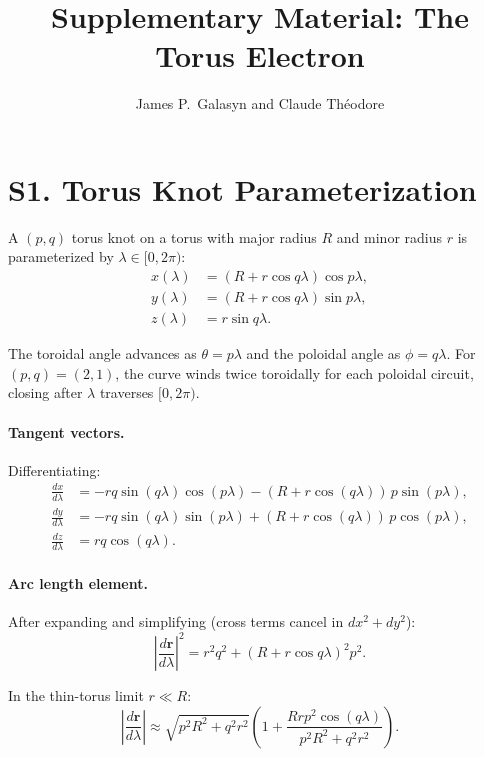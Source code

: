 \documentclass[11pt,a4paper]{article}
\title{\textbf{Supplementary Material: The Torus Electron}}
\author{James P.\ Galasyn and Claude Th\'eodore}
\date{}
\begin{document}
\maketitle

\section{S1. Torus Knot Parameterization}
\label{sec:S1}

A $(p,q)$ torus knot on a torus with major radius $R$ and minor radius $r$ is parameterized by $\lambda \in [0, 2\pi)$:
\begin{align}
  x(\lambda) &= (R + r\cos q\lambda)\cos p\lambda, \\
  y(\lambda) &= (R + r\cos q\lambda)\sin p\lambda, \\
  z(\lambda) &= r\sin q\lambda.
\end{align}

The toroidal angle advances as $\theta = p\lambda$ and the poloidal angle as $\phi = q\lambda$. For $(p,q) = (2,1)$, the curve winds twice toroidally for each poloidal circuit, closing after $\lambda$ traverses $[0, 2\pi)$.

\paragraph{Tangent vectors.} Differentiating:
\begin{align}
  \frac{dx}{d\lambda} &= -rq\sin(q\lambda)\cos(p\lambda) - (R + r\cos(q\lambda))\,p\sin(p\lambda), \\
  \frac{dy}{d\lambda} &= -rq\sin(q\lambda)\sin(p\lambda) + (R + r\cos(q\lambda))\,p\cos(p\lambda), \\
  \frac{dz}{d\lambda} &= rq\cos(q\lambda).
\end{align}

\paragraph{Arc length element.} After expanding and simplifying (cross terms cancel in $dx^2 + dy^2$):
\begin{equation}
  \left|\frac{d\mathbf{r}}{d\lambda}\right|^2 = r^2 q^2 + (R + r\cos q\lambda)^2 p^2.
\end{equation}

In the thin-torus limit $r \ll R$:
\begin{equation}
  \left|\frac{d\mathbf{r}}{d\lambda}\right| \approx \sqrt{p^2 R^2 + q^2 r^2}\left(1 + \frac{Rrp^2\cos(q\lambda)}{p^2 R^2 + q^2 r^2}\right).
\end{equation}
\end{document}

